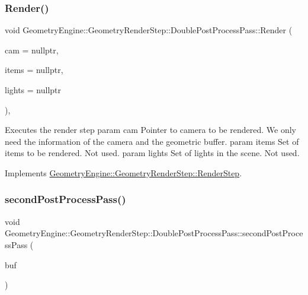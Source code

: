 \subsubsection{\texorpdfstring{Render()}{Render()}}
{\footnotesize\ttfamily void Geometry\+Engine\+::\+Geometry\+Render\+Step\+::\+Double\+Post\+Process\+Pass\+::\+Render (\begin{DoxyParamCaption}\item[{\mbox{\hyperlink{class_geometry_engine_1_1_geometry_world_item_1_1_geometry_camera_1_1_camera}{Geometry\+World\+Item\+::\+Geometry\+Camera\+::\+Camera}} $\ast$}]{cam = {\ttfamily nullptr},  }\item[{std\+::unordered\+\_\+set$<$ \mbox{\hyperlink{class_geometry_engine_1_1_geometry_world_item_1_1_geometry_item_1_1_geometry_item}{Geometry\+World\+Item\+::\+Geometry\+Item\+::\+Geometry\+Item}} $\ast$ $>$ $\ast$}]{items = {\ttfamily nullptr},  }\item[{std\+::unordered\+\_\+set$<$ \mbox{\hyperlink{class_geometry_engine_1_1_geometry_world_item_1_1_geometry_light_1_1_light}{Geometry\+World\+Item\+::\+Geometry\+Light\+::\+Light}} $\ast$ $>$ $\ast$}]{lights = {\ttfamily nullptr} }\end{DoxyParamCaption})\hspace{0.3cm}{\ttfamily [override]}, {\ttfamily [virtual]}}

Executes the render step param cam Pointer to camera to be rendered. We only need the information of the camera and the geometric buffer. param items Set of items to be rendered. Not used. param lights Set of lights in the scene. Not used. 

Implements \mbox{\hyperlink{class_geometry_engine_1_1_geometry_render_step_1_1_render_step_a9b054ee8f38304319a9d03ba3e173dcd}{Geometry\+Engine\+::\+Geometry\+Render\+Step\+::\+Render\+Step}}.

\mbox{\label{class_geometry_engine_1_1_geometry_render_step_1_1_double_post_process_pass_a9e20097c5cdd938e362951975810e2a3}} 
\subsubsection{\texorpdfstring{secondPostProcessPass()}{secondPostProcessPass()}}
{\footnotesize\ttfamily void Geometry\+Engine\+::\+Geometry\+Render\+Step\+::\+Double\+Post\+Process\+Pass\+::second\+Post\+Process\+Pass (\begin{DoxyParamCaption}\item[{\mbox{\hyperlink{class_geometry_engine_1_1_geometry_buffer_1_1_g_buffer}{Geometry\+Buffer\+::\+G\+Buffer}} $\ast$}]{buf }\end{DoxyParamCaption})\hspace{0.3cm}{\ttfamily [protected]}}

